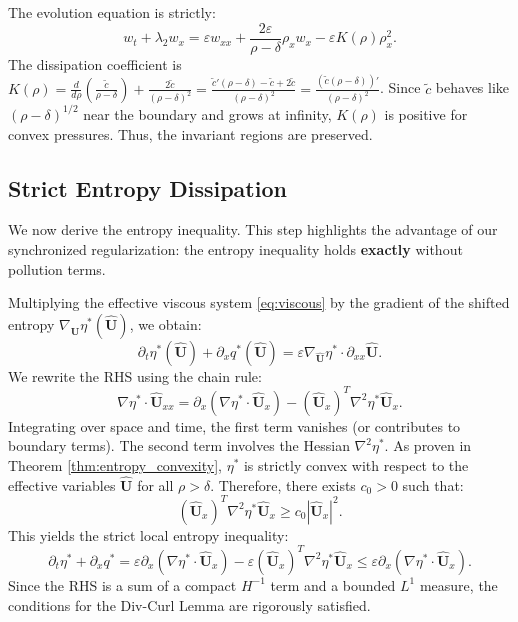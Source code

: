 \documentclass[12pt, reqno]{article}
\theoremstyle{definition}
\numberwithin{equation}{section}
\begin{document}
The evolution equation is strictly:
\begin{equation} \label{eq:w_dissipation}
    w_t + \lambda_2 w_x = \varepsilon w_{xx} + \frac{2\varepsilon}{\rho-\delta}\rho_x w_x - \varepsilon K(\rho) \rho_x^2.
\end{equation}
The dissipation coefficient is $K(\rho) = \frac{d}{d\rho}(\frac{\tilde{c}}{\rho-\delta}) + \frac{2\tilde{c}}{(\rho-\delta)^2} = \frac{\tilde{c}'(\rho-\delta) - \tilde{c} + 2\tilde{c}}{(\rho-\delta)^2} = \frac{(\tilde{c}(\rho-\delta))'}{(\rho-\delta)^2}$. Since $\tilde{c}$ behaves like $(\rho-\delta)^{1/2}$ near the boundary and grows at infinity, $K(\rho)$ is positive for convex pressures. Thus, the invariant regions are preserved.

\subsection{Strict Entropy Dissipation}

We now derive the entropy inequality. This step highlights the advantage of our synchronized regularization: the entropy inequality holds \textbf{exactly} without pollution terms.

Multiplying the effective viscous system \eqref{eq:viscous} by the gradient of the shifted entropy $\nabla_{\hat{\mathbf{U}}} \eta^*(\hat{\mathbf{U}})$, we obtain:
\begin{equation}\label{eq:entropy_identity}
    \partial_t \eta^*(\hat{\mathbf{U}}) + \partial_x q^*(\hat{\mathbf{U}}) = \varepsilon \nabla_{\hat{\mathbf{U}}} \eta^* \cdot \partial_{xx} \hat{\mathbf{U}}.
\end{equation}
We rewrite the RHS using the chain rule:
\[
    \nabla \eta^* \cdot \hat{\mathbf{U}}_{xx} = \partial_x (\nabla \eta^* \cdot \hat{\mathbf{U}}_x) - (\hat{\mathbf{U}}_x)^T \nabla^2 \eta^* \hat{\mathbf{U}}_x.
\]
Integrating over space and time, the first term vanishes (or contributes to boundary terms). The second term involves the Hessian $\nabla^2 \eta^*$. 
As proven in Theorem \ref{thm:entropy_convexity}, $\eta^*$ is strictly convex with respect to the effective variables $\hat{\mathbf{U}}$ for all $\rho > \delta$. Therefore, there exists $c_0 > 0$ such that:
\begin{equation}
    (\hat{\mathbf{U}}_x)^T \nabla^2 \eta^* \hat{\mathbf{U}}_x \ge c_0 |\hat{\mathbf{U}}_x|^2.
\end{equation}
This yields the strict local entropy inequality:
\begin{equation}
    \partial_t \eta^* + \partial_x q^* = \varepsilon \partial_x (\nabla \eta^* \cdot \hat{\mathbf{U}}_x) - \varepsilon (\hat{\mathbf{U}}_x)^T \nabla^2 \eta^* \hat{\mathbf{U}}_x \le \varepsilon \partial_x (\nabla \eta^* \cdot \hat{\mathbf{U}}_x).
\end{equation}
Since the RHS is a sum of a compact $H^{-1}$ term and a bounded $L^1$ measure, the conditions for the Div-Curl Lemma are rigorously satisfied.
\end{document}
